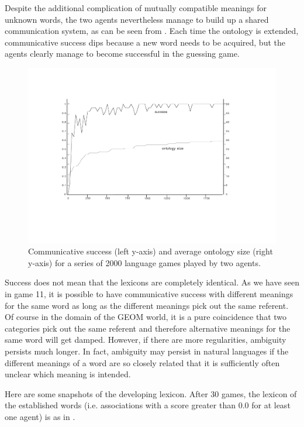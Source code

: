 Despite the additional complication of mutually 
compatible meanings for unknown words, the two agents
nevertheless manage to 
build up a shared communication system, as can be seen 
from . Each time the ontology is 
extended, communicative success dips because a new 
word needs to be acquired, but the agents clearly 
manage to become successful in the guessing game. 



\begin{figure}[htbp]
  \centerline{\includegraphics[width=\textwidth]{chap6/figs/gsucc3.pdf}}
\caption{\label{gsucc3}Communicative 
success (left y-axis) and average ontology size 
(right y-axis) for a series of 2000
language games played by two agents.} 
\end{figure}
Success does not mean that the lexicons are completely 
identical. As we have seen in game 11, it is possible
to have communicative success with different 
meanings for the same word as long as the different meanings
pick out the same referent. Of course in the domain of
the GEOM world, it is a pure coincidence that two categories
pick out the same referent and therefore alternative 
meanings for the same word will get damped. However, if there
are more regularities, ambiguity persists much longer. 
In fact, ambiguity may persist in natural languages if 
the different meanings of a word are so 
closely related that it is sufficiently often unclear
which meaning is intended. 

Here are some snapshots of the developing lexicon. 
After 30 games, the lexicon of the established
words (i.e. associations with a score greater 
than 0.0 for at least one agent) is as in . 



